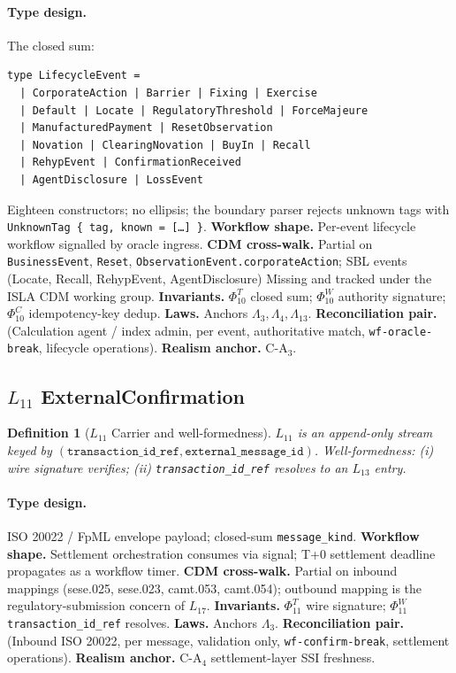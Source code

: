 \documentclass[11pt,a4paper]{article}
\newtheorem{definition}{Definition}[section]
\begin{document}
\paragraph{Type design.} The closed sum:
\begin{lstlisting}
type LifecycleEvent =
  | CorporateAction | Barrier | Fixing | Exercise
  | Default | Locate | RegulatoryThreshold | ForceMajeure
  | ManufacturedPayment | ResetObservation
  | Novation | ClearingNovation | BuyIn | Recall
  | RehypEvent | ConfirmationReceived
  | AgentDisclosure | LossEvent
\end{lstlisting}
Eighteen constructors; no ellipsis; the boundary parser rejects unknown tags with \texttt{UnknownTag \{ tag, known = [\dots] \}}. \textbf{Workflow shape.} Per-event lifecycle workflow signalled by oracle ingress. \textbf{CDM cross-walk.} Partial on \texttt{BusinessEvent}, \texttt{Reset}, \texttt{ObservationEvent.corporateAction}; SBL events (Locate, Recall, RehypEvent, AgentDisclosure) Missing and tracked under the ISLA CDM working group. \textbf{Invariants.} $\Phi_{10}^T$ closed sum; $\Phi_{10}^W$ authority signature; $\Phi_{10}^C$ idempotency-key dedup. \textbf{Laws.} Anchors $\Lambda_3, \Lambda_4, \Lambda_{13}$. \textbf{Reconciliation pair.} (Calculation agent / index admin, per event, authoritative match, \texttt{wf-oracle-break}, lifecycle operations). \textbf{Realism anchor.} $\mathrm{C\textrm{-}A}_3$.

\subsection{$L_{11}$ ExternalConfirmation}
\label{sec:leaf-l11}

\begin{definition}[$L_{11}$ Carrier and well-formedness]
$L_{11}$ is an append-only stream keyed by $(\texttt{transaction\_id\_ref}, \texttt{external\_message\_id})$. Well-formedness: (i) wire signature verifies; (ii) \texttt{transaction\_id\_ref} resolves to an $L_{13}$ entry.
\end{definition}

\paragraph{Type design.} ISO 20022 / FpML envelope payload; closed-sum \texttt{message\_kind}. \textbf{Workflow shape.} Settlement orchestration consumes via signal; T+0 settlement deadline propagates as a workflow timer. \textbf{CDM cross-walk.} Partial on inbound mappings (sese.025, sese.023, camt.053, camt.054); outbound mapping is the regulatory-submission concern of $L_{17}$. \textbf{Invariants.} $\Phi_{11}^T$ wire signature; $\Phi_{11}^W$ \texttt{transaction\_id\_ref} resolves. \textbf{Laws.} Anchors $\Lambda_3$. \textbf{Reconciliation pair.} (Inbound ISO 20022, per message, validation only, \texttt{wf-confirm-break}, settlement operations). \textbf{Realism anchor.} $\mathrm{C\textrm{-}A}_4$ settlement-layer SSI freshness.
\end{document}
